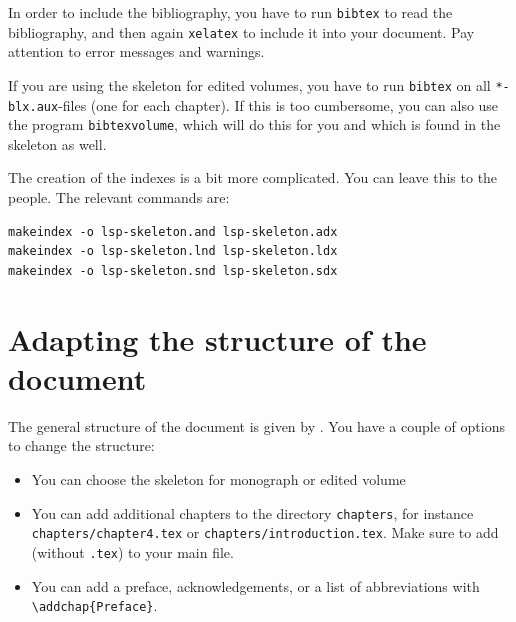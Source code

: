 In order to include the bibliography, you have to run \verb+bibtex+ to read the bibliography, and then again \verb+xelatex+ to include it into your document. Pay attention to error messages and warnings.

\enlargethispage{1em}
If you are using the skeleton for edited volumes, you have to run  \verb+bibtex+ on all \verb+*-blx.aux+-files (one for each chapter). If this is too cumbersome, you can also use the program \verb+bibtexvolume+, which will do this for you and which is found in the skeleton as well. 

The creation of the indexes is a bit more complicated. You can leave this to the \lsp people. The relevant commands are:

\begin{verbatim}
makeindex -o lsp-skeleton.and lsp-skeleton.adx
makeindex -o lsp-skeleton.lnd lsp-skeleton.ldx 
makeindex -o lsp-skeleton.snd lsp-skeleton.sdx
\end{verbatim} 


\section{Adapting the structure of the document}
The general structure of the document is given by \lsp. You have a couple of options to change the structure:
\begin{itemize}
 \item You can choose the skeleton for monograph or edited volume
 \item You can add additional chapters to the directory \verb+chapters+, for instance\\ \verb+chapters/chapter4.tex+ or \verb+chapters/introduction.tex+. Make sure to add \verb++ (without \verb+.tex+) to your main file.
 \item You can add a preface, acknowledgements, or a list of abbreviations with\\ \verb+\addchap{Preface}+.
 \end{itemize}



